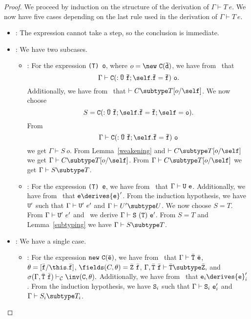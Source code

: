 \begin{proof}
We proceed by induction on the
structure of the derivation of $\Gamma \vdash T\ e$.  We now have five
cases depending on the last rule used in the derivation
of $\Gamma \vdash T\ e$.
\begin{itemize}
\item
\TVar: The expression cannot take a step, so the conclusion is immediate.
\item
\TCast: We have two subcases.
   \begin{itemize}
   \item
   \RCast:  For the expression {\tt (T)~o}, where 
            $o = {\tt \new\ {\tt C(\bar{\tt d})}}$,
            we have from \TCast\ that 
            $$\Gamma \vdash {\tt C(:\bar{U}\ \bar{\tt f}
                {\tt ;\self.\bar{f}}=\bar{\tt f})\ o}.$$
            Additionally, we have from \RCast\ that 
            $\vdash C \subtype T[o/\self]$.
            We now choose 
            $$S = {\tt C(:\bar{U}\ \bar{\tt f}
                {\tt ;\self.\bar{f}}=\bar{\tt f}; \self=o)}.$$
            From 
            $$\Gamma \vdash {\tt C(:\bar{U}\ \bar{\tt f}
                {\tt ;\self.\bar{f}}=\bar{\tt f})~o}$$
            we get
            $\Gamma \vdash S\ o$.
            From Lemma~\ref{weakening} and $\vdash C \subtype T[o/\self]$ 
            we get 
            $\Gamma \vdash C \subtype T[o/\self]$.
            From $\Gamma \vdash C \subtype T[o/\self]$ we get
            $\Gamma \vdash 
                S \subtype T$.
   \item
   \RCCast: For the expression {\tt (T)~e}, we have from \TCast\ that
            $\Gamma \vdash {\tt U}\ {\tt e}$.
            Additionally, we have from \RCCast\ that
            ${\tt e} \derives {{\tt e}}'$.
            From the induction hypothesis, we have ${\tt U}'$ such that
            $\Gamma \vdash {\tt U}'\ e'$ and $\Gamma \vdash U' \subtype U$.
            We now choose $S=T$.
            From $\Gamma \vdash {\tt U}'\ e'$ and \TCast\ we derive
            $\Gamma \vdash {\tt S}\ {\tt (T)~e'}$.
            From $S=T$ and Lemma~\ref{subtyping}
            we have $\Gamma \vdash S \subtype T$.
   \end{itemize}
\item
\TNew: We have a single case.
   \begin{itemize}
   \item
   \RCNewArg: For the expression ${\tt new\ C(\bar{e})}$,
            we have from \TNew\ that
            $\Gamma \vdash \bar{\tt T}\ \bar{\tt e}$,
            $\theta=[\bar{\tt f}/\this.\bar{\tt f}]$,
            $\fields(C,\theta)=\bar{\tt Z}\ \bar{\tt f}$,
            $\Gamma, \bar{\tt T}\ \bar{\tt f} \vdash 
                    \bar{\tt T} \subtype \bar{\tt Z},$ and 
            $\sigma(\Gamma, \bar{\tt T}\ \bar{\tt f}) \vdash_{\cal C} 
                    \inv({\tt C},\theta).$
            Additionally, we have from \RCNewArg\ that
            ${\tt e}_i \derives {{\tt e}}_i'$.
            From the induction hypothesis, we have ${\tt S}_i$ such that
            $\Gamma \vdash {\tt S}_i\ {{\tt e}}_i'$ and 
            $\Gamma \vdash S_i \subtype T_i$.


\end{itemize}
\end{itemize}
\end{proof}
